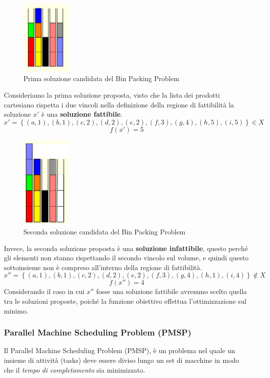 \documentclass{article}
\begin{document}
\begin{figure}[H]
    \centering
    \includegraphics[width=2.5cm]{images/sol1_BPP.png}
    \caption{Prima soluzione candidata del Bin Packing Problem}
    \label{fig:sol1_BPP}
\end{figure}

Consideriamo la prima soluzione proposta, visto che la lista dei prodotti cartesiano
rispetta i due vincoli nella definizione della regione
di fattibilità la soluzione $x'$ è una \textbf{soluzione fattibile}.
$$x'=\left\{(a,1),(b,1),(c,2),(d,2),(e,2),(f,3),(g,4),(h,5),(i,5)\right\}\in X$$
$$f(x')=5$$

\begin{figure}[H]
    \centering
    \includegraphics[width=2.5cm]{images/sol2_BPP.png}
    \caption{Seconda soluzione candidata del Bin Packing Problem}
    \label{fig:sol2_BPP}
\end{figure}

Invece, la seconda soluzione proposta è una \textbf{soluzione infattibile}, questo perché gli elementi non stanno
rispettando il secondo vincolo sul volume, e quindi
questo sottoinsieme non è compreso all'interno della regione di fattibilità.
$$x''=\left\{(a,1),(b,1),(c,2),(d,2),(e,2),(f,3),(g,4),(h,1),(i,4)\right\}\notin X$$
$$f(x'')=4$$
Considerando il caso in cui $x''$ fosse una soluzione fattibile avremmo scelto quella tra le soluzioni
proposte, poiché la funzione obiettivo effettua l'ottimizzazione sul minimo.

\subsubsection{Parallel Machine Scheduling Problem (PMSP)}
Il Parallel Machine Scheduling Problem (PMSP), è un problema nel quale un insieme di attività (tasks) deve essere diviso lungo un set di macchine in modo che
il \textit{tempo di completamento} sia minimizzato.
\end{document}
